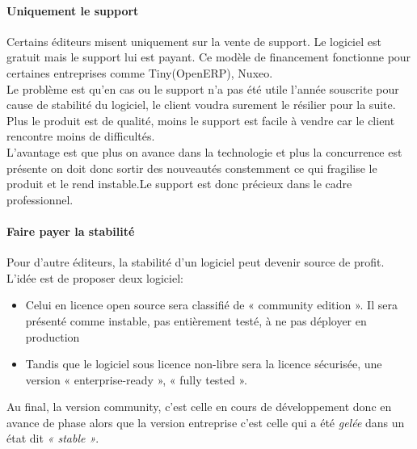 			\paragraph{Uniquement le support\\}

			Certains éditeurs misent uniquement sur la vente de support. Le logiciel est gratuit mais le support lui est payant. Ce modèle de financement fonctionne pour certaines entreprises comme Tiny(OpenERP), Nuxeo.\\

			Le problème est qu'en cas ou le support n'a pas été utile l'année souscrite pour cause de stabilité du logiciel, le client voudra surement le résilier pour la suite.\\

			Plus le produit est de qualité, moins le support est facile à vendre car le client rencontre moins de difficultés.\\

			L'avantage est que plus on avance dans la technologie et plus la concurrence est présente on doit donc sortir des nouveautés constemment ce qui fragilise le produit et le rend instable.Le support est donc précieux dans le cadre professionnel.

			\paragraph{Faire payer la stabilité\\}

			Pour d'autre éditeurs, la stabilité d'un logiciel peut devenir source de profit. L'idée est de proposer deux logiciel:\\

			\begin{itemize}[label=\textbullet, font=\LARGE \color{burntorange}]
				\item Celui en licence open source sera classifié de « community edition ». Il sera présenté comme instable, pas entièrement testé, à ne pas déployer en production
				\item Tandis que le logiciel sous licence non-libre sera la licence sécurisée, une version « enterprise-ready », « fully tested ».
			\end{itemize} 

			Au final, la version community, c'est celle en cours de développement donc en avance de phase alors que la version entreprise c'est celle qui a été \textit{gelée} dans un état dit \textit{« stable »}.\\

